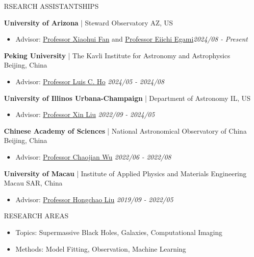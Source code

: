 \documentclass[11pt]{article} %
\begin{document}
\begin{section}{RSEARCH ASSISTANTSHIPS}

\textbf{University of Arizona} | Steward Observatory \hfill AZ, US 
\begin{itemize}[leftmargin=1.5em]
\item Advisor: \href{mailto:xfan@arizona.edu}{Professor Xiaohui Fan} and \href{mailto:egami@arizona.edu}{Professor Eiichi Egami}\hfill \textit{2024/08 - Present}
\end{itemize}

\textbf{Peking University} | The Kavli Institute for Astronomy and Astrophysics \hfill Beijing, China 
\begin{itemize}[leftmargin=1.5em]
\item Advisor: \href{mailto:lho.pku@gmail.com}{Professor Luis C. Ho} \hfill \textit{2024/05 - 2024/08}
\end{itemize}

\textbf{University of Illinos Urbana-Champaign} | Department of Astronomy \hfill IL, US 
\begin{itemize}[leftmargin=1.5em]
\item Advisor: \href{mailto:xinliuxl@illinois.edu}{Professor Xin Liu} \hfill \textit{2022/09 - 2024/05}
\end{itemize}

\textbf{Chinese Academy of Sciences} | National Astronomical Observatory of China \hfill Beijing, China 
\begin{itemize}[leftmargin=1.5em]
\item Advisor: \href{mailto:chjwu@bao.ac.cn}{Professor Chaojian Wu} \hfill \textit{2022/06 - 2022/08} 
\end{itemize}

\textbf{University of Macau} | Institute of Applied Physics and Materials Engineering \hfill Macau SAR, China
\begin{itemize}[leftmargin=1.5em]
\item Advisor: \href{mailto:hcliu@um.edu.mo}{Professor Hongchao Liu} \hfill \textit{2019/09 - 2022/05}
\end{itemize}

\end{section}

\begin{section}{RESEARCH AREAS}

\begin{itemize}[leftmargin=1.5em]
    \item Topics: Supermassive Black Holes, Galaxies, Computational Imaging
    \item Methods: Model Fitting, Observation, Machine Learning 
\end{itemize}

\end{section}
\end{document}
